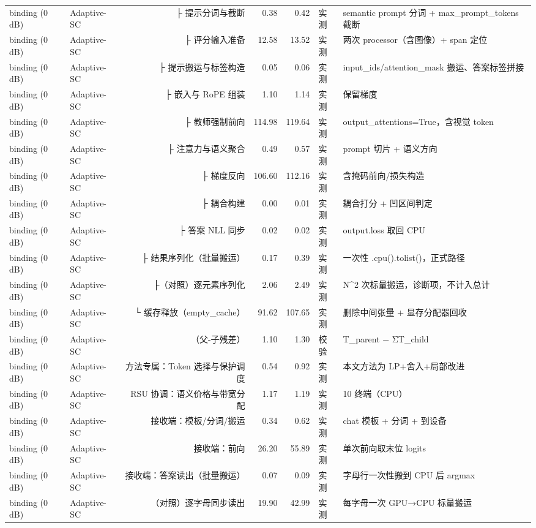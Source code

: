 \begin{tabular}{llrrrl}
binding (0 dB) & Adaptive-SC & ├ 提示分词与截断 & 0.38 & 0.42 & 实测 & semantic prompt 分词 + max_prompt_tokens 截断\\
binding (0 dB) & Adaptive-SC & ├ 评分输入准备 & 12.58 & 13.52 & 实测 & 两次 processor（含图像）+ span 定位\\
binding (0 dB) & Adaptive-SC & ├ 提示搬运与标签构造 & 0.05 & 0.06 & 实测 & input_ids/attention_mask 搬运、答案标签拼接\\
binding (0 dB) & Adaptive-SC & ├ 嵌入与 RoPE 组装 & 1.10 & 1.14 & 实测 & 保留梯度\\
binding (0 dB) & Adaptive-SC & ├ 教师强制前向 & 114.98 & 119.64 & 实测 & output_attentions=True，含视觉 token\\
binding (0 dB) & Adaptive-SC & ├ 注意力与语义聚合 & 0.49 & 0.57 & 实测 & prompt 切片 + 语义方向\\
binding (0 dB) & Adaptive-SC & ├ 梯度反向 & 106.60 & 112.16 & 实测 & 含掩码前向/损失构造\\
binding (0 dB) & Adaptive-SC & ├ 耦合构建 & 0.00 & 0.01 & 实测 & 耦合打分 + 凹区间判定\\
binding (0 dB) & Adaptive-SC & ├ 答案 NLL 同步 & 0.02 & 0.02 & 实测 & output.loss 取回 CPU\\
binding (0 dB) & Adaptive-SC & ├ 结果序列化（批量搬运） & 0.17 & 0.39 & 实测 & 一次性 .cpu().tolist()，正式路径\\
binding (0 dB) & Adaptive-SC & ├（对照）逐元素序列化 & 2.06 & 2.49 & 实测 & N^2 次标量搬运，诊断项，不计入总计\\
binding (0 dB) & Adaptive-SC & └ 缓存释放（empty_cache） & 91.62 & 107.65 & 实测 & 删除中间张量 + 显存分配器回收\\
binding (0 dB) & Adaptive-SC & （父-子残差） & 1.10 & 1.30 & 校验 & T_parent − ΣT_child\\
binding (0 dB) & Adaptive-SC & 方法专属：Token 选择与保护调度 & 0.54 & 0.92 & 实测 & 本文方法为 LP+舍入+局部改进\\
binding (0 dB) & Adaptive-SC & RSU 协调：语义价格与带宽分配 & 1.17 & 1.19 & 实测 & 10 终端（CPU）\\
binding (0 dB) & Adaptive-SC & 接收端：模板/分词/搬运 & 0.34 & 0.62 & 实测 & chat 模板 + 分词 + 到设备\\
binding (0 dB) & Adaptive-SC & 接收端：前向 & 26.20 & 55.89 & 实测 & 单次前向取末位 logits\\
binding (0 dB) & Adaptive-SC & 接收端：答案读出（批量搬运） & 0.07 & 0.09 & 实测 & 字母行一次性搬到 CPU 后 argmax\\
binding (0 dB) & Adaptive-SC & （对照）逐字母同步读出 & 19.90 & 42.99 & 实测 & 每字母一次 GPU→CPU 标量搬运\\

\end{tabular}
